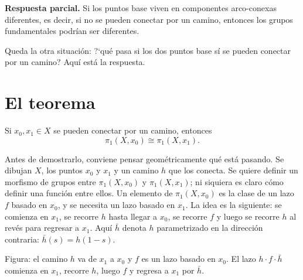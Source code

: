 \documentclass[11pt]{article}
\begin{document}
\medskip\noindent\textbf{Respuesta parcial.} Si los puntos base viven en componentes arco-conexas diferentes, es decir, si no se pueden conectar por un camino, entonces los grupos fundamentales podrían ser diferentes.

Queda la otra situación: ?`qué pasa si los dos puntos base sí se pueden conectar por un camino? Aquí está la respuesta.

\section*{El teorema}

\begin{teo}
Si $x_0,x_1\in X$ se pueden conectar por un camino, entonces
\[
  \pi_1(X,x_0)\cong\pi_1(X,x_1).
\]
\end{teo}

Antes de demostrarlo, conviene pensar geométricamente qué está pasando. Se dibujan $X$, los puntos $x_0$ y $x_1$ y un camino $h$ que los conecta. Se quiere definir un morfismo de grupos entre $\pi_1(X,x_0)$ y $\pi_1(X,x_1)$; ni siquiera es claro cómo definir una función entre ellos. Un elemento de $\pi_1(X,x_0)$ es la clase de un lazo $f$ basado en $x_0$, y se necesita un lazo basado en $x_1$. La idea es la siguiente: se comienza en $x_1$, se recorre $h$ hasta llegar a $x_0$, se recorre $f$ y luego se recorre $h$ al revés para regresar a $x_1$. Aquí $\bar h$ denota $h$ parametrizado en la dirección contraria: $\bar h(s)=h(1-s)$.

\begin{center}
\end{center}

\noindent Figura: el camino $h$ va de $x_1$ a $x_0$ y $f$ es un lazo basado en $x_0$. El lazo $h\cdot f\cdot\bar h$ comienza en $x_1$, recorre $h$, luego $f$ y regresa a $x_1$ por $\bar h$.
\end{document}
